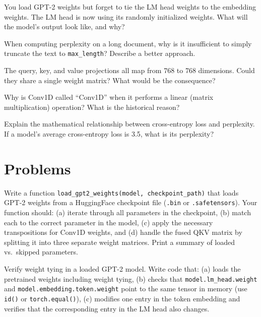 \begin{reviewquestion}[9]
  You load GPT-2 weights but forget to tie the LM head weights to the
  embedding weights. The LM head is now using its randomly initialized
  weights. What will the model's output look like, and why?
\end{reviewquestion}

\begin{reviewquestion}[10]
  When computing perplexity on a long document, why is it insufficient to
  simply truncate the text to \texttt{max\_length}? Describe a better
  approach.
\end{reviewquestion}

\begin{reviewquestion}[11]
  The query, key, and value projections all map from 768 to 768
  dimensions. Could they share a single weight matrix? What would be the
  consequence?
\end{reviewquestion}

\begin{reviewquestion}[12]
  Why is Conv1D called ``Conv1D'' when it performs a linear (matrix
  multiplication) operation? What is the historical reason?
\end{reviewquestion}

\begin{reviewquestion}[13]
  Explain the mathematical relationship between cross-entropy loss and
  perplexity. If a model's average cross-entropy loss is 3.5, what is its
  perplexity?
\end{reviewquestion}

\section*{Problems}

\begin{problem}[1]
  Write a function \texttt{load\_gpt2\_weights(model, checkpoint\_path)} that
  loads GPT-2 weights from a HuggingFace checkpoint file
  (\texttt{.bin} or \texttt{.safetensors}). Your function should:
  (a) iterate through all parameters in the checkpoint,
  (b) match each to the correct parameter in the model,
  (c) apply the necessary transpositions for Conv1D weights, and
  (d) handle the fused QKV matrix by splitting it into three separate
  weight matrices. Print a summary of loaded vs.\ skipped parameters.
\end{problem}

\begin{problem}[2]
  Verify weight tying in a loaded GPT-2 model. Write code that:
  (a) loads the pretrained weights including weight tying,
  (b) checks that \texttt{model.lm\_head.weight} and
  \texttt{model.embedding.token.weight} point to the same tensor in memory
  (use \texttt{id()} or \texttt{torch.equal()}),
  (c) modifies one entry in the token embedding and verifies that the
  corresponding entry in the LM head also changes.
\end{problem}

